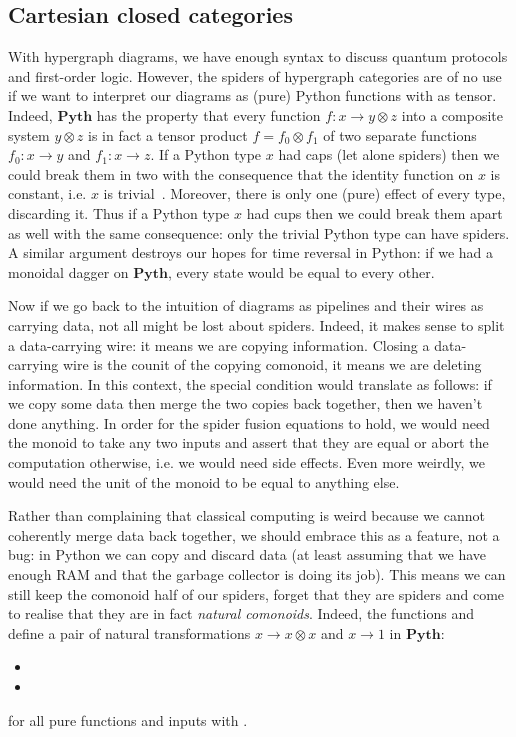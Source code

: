 
\subsection{Cartesian closed categories}

With hypergraph diagrams, we have enough syntax to discuss quantum protocols and first-order logic.
However, the spiders of hypergraph categories are of no use if we want to interpret our diagrams as (pure) Python functions with  as tensor.
Indeed, $\mathbf{Pyth}$ has the property that every function $f : x \to y \otimes z$ into a composite system $y \otimes z$ is in fact a tensor product $f = f_0 \otimes f_1$ of two separate functions $f_0 : x \to y$ and $f_1 : x \to z$.
If a Python type $x$ had caps (let alone spiders) then we could break them in two with the consequence that the identity function on $x$ is constant, i.e. $x$ is trivial~\cite[?]{CoeckeKissinger17}.
Moreover, there is only one (pure) effect of every type, discarding it.
Thus if a Python type $x$ had cups then we could break them apart as well with the same consequence: only the trivial Python type can have spiders.
A similar argument destroys our hopes for time reversal in Python: if we had a monoidal dagger on $\mathbf{Pyth}$, every state would be equal to every other.

Now if we go back to the intuition of diagrams as pipelines and their wires as carrying data, not all might be lost about spiders.
Indeed, it makes sense to split a data-carrying wire: it means we are copying information.
Closing a data-carrying wire is the counit of the copying comonoid, it means we are deleting information.
In this context, the special condition would translate as follows: if we copy some data then merge the two copies back together, then we haven't done anything.
In order for the spider fusion equations to hold, we would need the monoid to take any two inputs and assert that they are equal or abort the computation otherwise, i.e. we would need side effects.
Even more weirdly, we would need the unit of the monoid to be equal to anything else.

Rather than complaining that classical computing is weird because we cannot coherently merge data back together, we should embrace this as a feature, not a bug: in Python we can copy and discard data (at least assuming that we have enough RAM and that the garbage collector is doing its job).
This means we can still keep the comonoid half of our spiders, forget that they are spiders and come to realise that they are in fact \emph{natural comonoids}.
Indeed, the functions  and  define a pair of natural transformations $x \to x \otimes x$ and $x \to 1$ in $\mathbf{Pyth}$:
\begin{itemize}
    \item {}
    \item {}
\end{itemize}
for all pure functions  and inputs  with .

